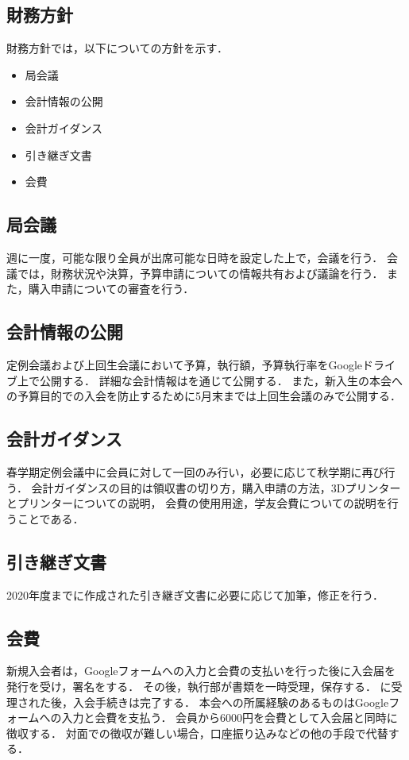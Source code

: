 \subsection*{財務方針}


財務方針では，以下についての方針を示す．
\begin{itemize}
  \item 局会議
  \item 会計情報の公開
  \item 会計ガイダンス
  \item 引き継ぎ文書
  \item 会費
\end{itemize}

\subsection*{局会議}
週に一度，可能な限り\kaikeiStaff{}全員が出席可能な日時を設定した上で，会議を行う．
会議では，財務状況や決算，予算申請についての情報共有および議論を行う．
また，購入申請についての審査を行う．

\subsection*{会計情報の公開}
定例会議および上回生会議において予算，執行額，予算執行率をGoogleドライブ上で公開する．
詳細な会計情報は\kaikeiStaff{}を通じて公開する．
また，新入生の本会への予算目的での入会を防止するために5月末までは上回生会議のみで公開する．

\subsection*{会計ガイダンス}
春学期定例会議中に会員に対して一回のみ行い，必要に応じて秋学期に再び行う．
会計ガイダンスの目的は領収書の切り方，購入申請の方法，3Dプリンターとプリンターについての説明，
会費の使用用途，学友会費についての説明を行うことである．

\subsection*{引き継ぎ文書}
2020年度までに作成された引き継ぎ文書に必要に応じて加筆，修正を行う．

\subsection*{会費}
新規入会者は，Googleフォームへの入力と会費の支払いを行った後に入会届を発行を受け，署名をする．
その後，執行部が書類を一時受理，保存する．
\president{}に受理された後，入会手続きは完了する．
本会への所属経験のあるものはGoogleフォームへの入力と会費を支払う．
会員から6000円を会費として入会届と同時に徴収する．
対面での徴収が難しい場合，口座振り込みなどの他の手段で代替する．
